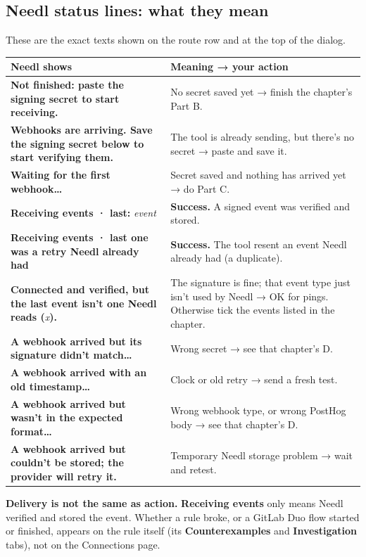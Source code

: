 \documentclass[11pt,a4paper]{article}
\newcommand{\ui}[1]{\textbf{#1}}
\begin{document}
\subsection{Needl status lines: what they mean}
These are the exact texts shown on the route row and at the top of the dialog.
\begin{longtable}{@{}L{78mm}L{84mm}@{}}
\toprule
\textbf{Needl shows} & \textbf{Meaning → your action}\\
\midrule
\endhead
\ui{Not finished: paste the signing secret to start receiving.} & No secret saved yet → finish the chapter's Part B.\\
\ui{Webhooks are arriving. Save the signing secret below to start verifying them.} & The tool is already sending, but there's no secret → paste and save it.\\
\ui{Waiting for the first webhook…} & Secret saved and nothing has arrived yet → do Part C.\\
\ui{Receiving events · last: }\textit{event} & \textbf{Success.} A signed event was verified and stored.\\
\ui{Receiving events · last one was a retry Needl already had} & \textbf{Success.} The tool resent an event Needl already had (a duplicate).\\
\ui{Connected and verified, but the last event isn't one Needl reads (}\textit{x}\ui{).} & The signature is fine; that event type just isn't used by Needl → OK for pings. Otherwise tick the events listed in the chapter.\\
\ui{A webhook arrived but its signature didn't match…} & Wrong secret → see that chapter's D.\\
\ui{A webhook arrived with an old timestamp…} & Clock or old retry → send a fresh test.\\
\ui{A webhook arrived but wasn't in the expected format…} & Wrong webhook type, or wrong PostHog body → see that chapter's D.\\
\ui{A webhook arrived but couldn't be stored; the provider will retry it.} & Temporary Needl storage problem → wait and retest.\\
\bottomrule
\end{longtable}
\textbf{Delivery is not the same as action.} \ui{Receiving events} only means Needl verified and stored the event. Whether a rule broke, or a GitLab Duo flow started or finished, appears on the rule itself (its \ui{Counterexamples} and \ui{Investigation} tabs), not on the Connections page.

\clearpage
\end{document}
